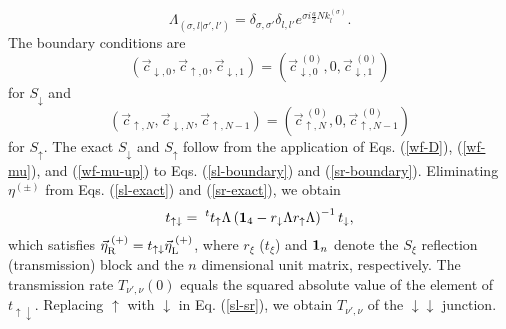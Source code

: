 \documentclass{jpsj3}
\begin{document}
\begin{equation}
\Lambda_{(\sigma,l|\sigma',l')}
=
\delta_{\sigma,\sigma'}\delta_{l,l'}e^{\sigma i\frac{a}{2}Nk_{l}^{(\sigma)}}.
\label{exact-lambda} 
\end{equation}
The boundary conditions are 
\begin{equation}
(\vec{c}_{\downarrow,0},\vec{c}_{\uparrow,0},\vec{c}_{\downarrow,1})
=(\vec{c}_{\downarrow,0}^{\;(0)},0,\vec{c}_{\downarrow,1}^{\;(0)})
\label{sl-boundary}
\end{equation}
for $S_\downarrow$ and
\begin{equation}
(\vec{c}_{\uparrow,N},\vec{c}_{\downarrow,N}, \vec{c}_{\uparrow,N-1})
=(\vec{c}_{\uparrow,N}^{ \;(0)} , 0,\vec{c}_{\uparrow,N-1}^{ \;(0)} )
\label{sr-boundary}
\end{equation}
for $S_\uparrow$. 
The exact $S_\downarrow$ and $S_\uparrow$ 
follow from the application of Eqs. (\ref{wf-D}), (\ref{wf-mu}), and (\ref{wf-mu-up}) to Eqs. (\ref{sl-boundary}) and (\ref{sr-boundary}).
Eliminating $\eta^{(\pm)}$ from Eqs. (\ref{sl-exact}) and (\ref{sr-exact}), 
we obtain \begin{equation}
t_{\uparrow\downarrow}=\;^tt_{\uparrow}\Lambda
\left({\bf 1}_4-r_{\downarrow}\Lambda r_{\uparrow}\Lambda\right)^{-1}
t_{\downarrow},
\label{sl-sr}
\end{equation}
which satisfies $\vec{\eta}^{\;(+)}_{\rm R}=t_{\uparrow\downarrow}\vec{\eta}^{\;(+)}_{\rm L}$,
where $r_{\xi}$ ($t_{\xi}$) and ${\bf 1}_n$ denote 
the $S_{\xi}$ reflection (transmission) block and the $n$
 dimensional unit matrix,   respectively.
The transmission rate $T_{\nu',\nu}(0)$ 
equals the squared absolute value of the element of $t_{\uparrow\downarrow}$.
Replacing $\uparrow$ with $\downarrow$ in Eq. (\ref{sl-sr}),
we obtain $T_{\nu',\nu}$ of the $\downarrow\downarrow$ junction.
\end{document}
